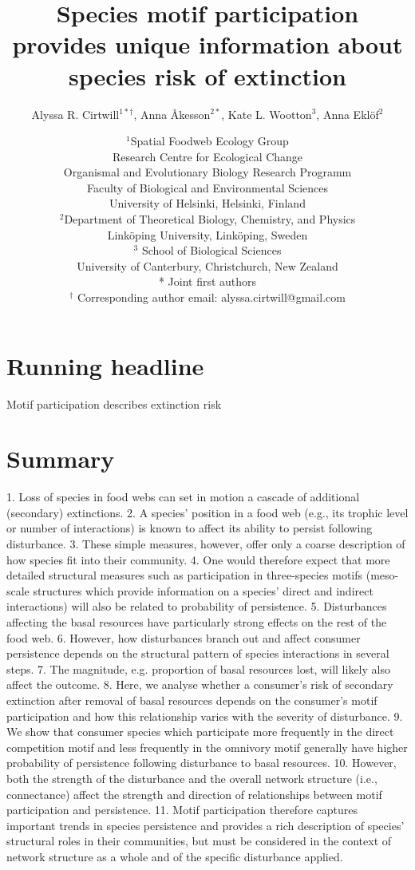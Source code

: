 \documentclass[12pt]{article}
\title{Species motif participation provides unique information about species risk of extinction}
\author{Alyssa R. Cirtwill$^{1*\dagger}$, Anna \r{A}kesson$^{2*}$, Kate L. Wootton$^{3}$, Anna Ekl\"{o}f$^{2}$}
\date{
\small$^1$Spatial Foodweb Ecology Group\\
Research Centre for Ecological Change\\
Organismal and Evolutionary Biology Research Programm\\
Faculty of Biological and Environmental Sciences\\
University of Helsinki, Helsinki, Finland\\
\medskip
\small$^2$Department of Theoretical Biology, Chemistry, and Physics\\ 
Link\"{o}ping University, Link\"{o}ping, Sweden\\
\medskip
\small$^3$ School of Biological Sciences\\
University of Canterbury, Christchurch, New Zealand\\
\medskip
* Joint first authors\\
\medskip
$^\dagger$ Corresponding author email: alyssa.cirtwill@gmail.com\\
}
\begin{document}
 
\maketitle 
\raggedright

\setlength{\parindent}{15pt} 

\section*{Running headline}
Motif participation describes extinction risk

\clearpage

\section*{Summary}

    1. Loss of species in food webs can set in motion a cascade of additional (secondary)  extinctions.
    2. A species' position in a food web (e.g., its trophic level or number of interactions) is known to affect its ability to persist following disturbance. 
    3. These simple measures, however, offer only a coarse description of how species fit into their community. 
    4. One would therefore expect that more detailed structural measures such as  participation in three-species motifs (meso-scale structures which provide information on a species' direct and indirect interactions) will also be related to probability of persistence.
    5. Disturbances affecting the basal resources have particularly strong effects on the rest of the food web. 
    6. However, how disturbances branch out and affect consumer persistence depends on the structural pattern of species interactions in several steps. 
    7. The magnitude, e.g. proportion of basal resources lost, will likely also affect the outcome.     
    8. Here, we analyse whether a consumer's risk of secondary extinction after removal of basal resources depends on the consumer's motif participation and how this relationship varies with the severity of disturbance.
    9. We show that consumer species which participate more frequently in the direct competition motif and less frequently in the omnivory motif generally have higher probability of persistence following disturbance to basal resources.
    10. However, both the strength of the disturbance and the overall network structure (i.e., connectance) affect the strength and direction of relationships between motif participation and persistence.
    11. Motif participation therefore captures important trends in species persistence and provides a rich description of species' structural roles in their communities, but must be considered in the context of network structure as a whole and of the specific disturbance applied.
\end{document}

